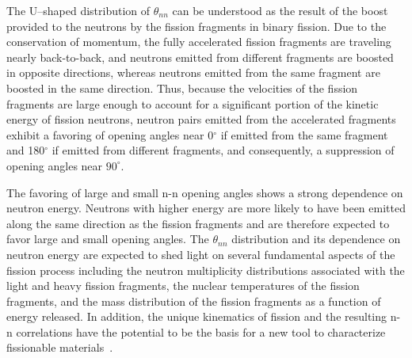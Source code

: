 The U--shaped distribution of $\theta_{nn}$ can be understood as the result of the boost provided to the neutrons by the fission fragments in binary fission.
Due to the conservation of momentum, the fully accelerated fission fragments are traveling nearly back-to-back, and neutrons emitted from different fragments are boosted in opposite directions, whereas neutrons emitted from the same fragment are boosted in the same direction.
Thus, because the velocities of the fission fragments are large enough to account for a significant portion of the kinetic energy of fission neutrons, neutron pairs emitted from the accelerated fragments exhibit a favoring of opening angles near 0$^{\circ}$ if emitted from the same fragment and 180$^{\circ}$ if emitted from different fragments, and consequently, a suppression of opening angles near $90^{\circ}$.

The favoring of large and small n-n opening angles shows a strong dependence on neutron energy.
Neutrons with higher energy are more likely to have been emitted along the same direction as the fission fragments and are therefore expected to favor large and small opening angles.
The $\theta_{nn}$ distribution and its dependence on neutron energy are expected to shed light on several fundamental aspects of the fission process including the neutron multiplicity distributions associated with the light and heavy fission fragments, the nuclear temperatures of the fission fragments, and the mass distribution of the fission fragments as a function of energy released.
In addition, the unique kinematics of fission and the resulting n-n correlations have the potential to be the basis for a new tool to characterize fissionable materials~\cite{Talou2018}. %



